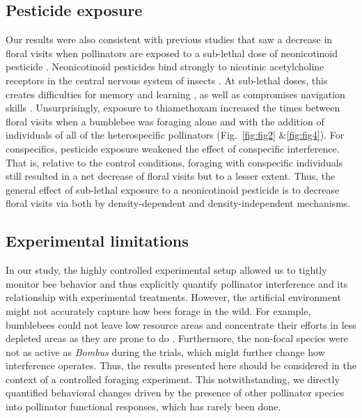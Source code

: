 \begin{refsection}
\subsection*{Pesticide exposure}

Our results were also consistent with previous studies that saw a decrease in floral visits when pollinators are exposed to a sub-lethal dose of neonicotinoid pesticide \citep{gill_chronic_2014, henry_common_2012, stanley_chronic_2016, mommaerts_risk_2009}. Neonicotinoid pesticides bind strongly to nicotinic acetylcholine receptors in the central nervous system of insects \citep{goulson_review_2013}. At sub-lethal doses, this creates difficulties for memory and learning \citep{henry_common_2012}, as well as compromises navigation skills \citep{desneux_sublethal_2007}. Unsurprisingly, exposure to thiamethoxam increased the times between floral visits when a bumblebee was foraging alone and with the addition of individuals  of all of the heterospecific pollinators (Fig.~\ref{fig:fig2} \&\ref{fig:fig4}). For conspecifics, pesticide exposure weakened the effect of conspecific interference. That is, relative to the control conditions, foraging with conspecific individuals still resulted in a net decrease of floral visits but to a lesser extent. Thus, the general effect of sub-lethal exposure to a neonicotinoid pesticide is to decrease floral visits via both by density-dependent and density-independent mechanisms.


\subsection*{Experimental limitations }

In our study, the highly controlled experimental setup allowed us to tightly monitor bee behavior and thus explicitly quantify pollinator interference and its relationship with experimental treatments. However, the artificial environment  might not accurately capture how bees forage in the wild. For example, bumblebees could not leave low resource areas and concentrate their efforts in less depleted areas as they are prone to do \citep{heinrich_bumblebee_2004}. Furthermore, the non-focal species were not as active as \textit{Bombus} during the trials, which might further change how interference operates. Thus, the results presented here should be considered in the context of a controlled foraging experiment. This notwithstanding, we directly quantified behavioral changes driven by the presence of other pollinator species into pollinator functional responses, which has rarely been done.


\end{refsection}
